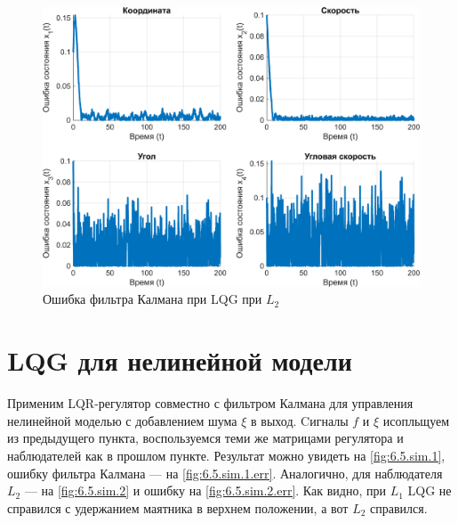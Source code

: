 \begin{figure}[H]
    \centering
    \includegraphics[width=0.9\linewidth]{figs/6.4.sim.2.err.png}
    \caption{Ошибка фильтра Калмана при LQG при $L_2$}
    \label{fig:6.4.sim.2.err}
\end{figure}

\section{LQG для нелинейной модели}

Применим LQR-регулятор совместно с фильтром Калмана для управления 
нелинейной моделью с добавлением шума $\xi$ в выход.
Cигналы $f$ и $\xi$ исопльщуем из предыдущего пункта,
воспользуемся теми же матрицами регулятора и наблюдателей как в прошлом 
пункте. Результат можно
увидеть на \autoref{fig:6.5.sim.1}, ошибку фильтра Калмана — на 
\autoref{fig:6.5.sim.1.err}. Аналогично, для наблюдателя $L_2$ — 
на \autoref{fig:6.5.sim.2} и ошибку на \autoref{fig:6.5.sim.2.err}. 
Как видно, при $L_1$ LQG не справился с удержанием маятника в верхнем положении,
а вот $L_2$ справился.

